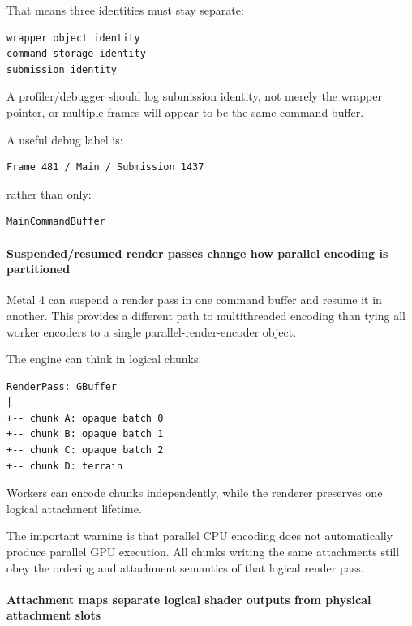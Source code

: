 That means three identities must stay separate:

\begin{verbatim}
wrapper object identity
command storage identity
submission identity
\end{verbatim}

A profiler/debugger should log submission identity, not merely the wrapper pointer, or multiple frames will appear to be the same command buffer.

A useful debug label is:

\begin{verbatim}
Frame 481 / Main / Submission 1437
\end{verbatim}

rather than only:

\begin{verbatim}
MainCommandBuffer
\end{verbatim}

\paragraph{Suspended/resumed render passes change how parallel encoding is partitioned}\label{suspendedresumed-render-passes-change-how-parallel-encoding-is-partitioned}

Metal 4 can suspend a render pass in one command buffer and resume it in another. This provides a different path to multithreaded encoding than tying all worker encoders to a single parallel-render-encoder object.

The engine can think in logical chunks:

\begin{verbatim}
RenderPass: GBuffer
|
+-- chunk A: opaque batch 0
+-- chunk B: opaque batch 1
+-- chunk C: opaque batch 2
+-- chunk D: terrain
\end{verbatim}

Workers can encode chunks independently, while the renderer preserves one logical attachment lifetime.

The important warning is that parallel CPU encoding does not automatically produce parallel GPU execution. All chunks writing the same attachments still obey the ordering and attachment semantics of that logical render pass.

\paragraph{Attachment maps separate logical shader outputs from physical attachment slots}\label{attachment-maps-separate-logical-shader-outputs-from-physical-attachment-slots}

